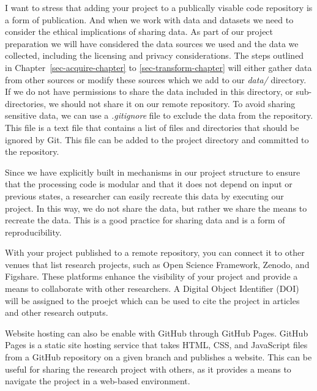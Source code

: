 \documentclass[
  letterpaper,
]{book}
\theoremstyle{definition}
\theoremstyle{remark}
\begin{document}
I want to stress that adding your project to a publically visable code
repository is a form of publication. And when we work with data and
datasets we need to consider the ethical implications of sharing data.
As part of our project preparation we will have considered the data
sources we used and the data we collected, including the licensing and
privacy considerations. The steps outlined in
Chapter~\ref{sec-acquire-chapter} to \ref{sec-transform-chapter} will
either gather data from other sources or modify these sources which we
add to our \emph{data/} directory. If we do not have permissions to
share the data included in this directory, or sub-directories, we should
not share it on our remote repository. To avoid sharing sensitive data,
we can use a \emph{.gitignore} file to exclude the data from the
repository. This file is a text file that contains a list of files and
directories that should be ignored by Git. This file can be added to the
project directory and committed to the repository.

Since we have explicitly built in mechanisms in our project structure to
ensure that the processing code is modular and that it does not depend
on input or previous states, a researcher can easily recreate this data
by executing our project. In this way, we do not share the data, but
rather we share the means to recreate the data. This is a good practice
for sharing data and is a form of reproducibility.

With your project published to a remote repository, you can connect it
to other venues that list research projects, such as Open Science
Framework, Zenodo, and Figshare. These platforms enhance the visibility
of your project and provide a means to collaborate with other
researchers. A Digital Object Identifier (DOI) will be assigned to the
proejct which can be used to cite the project in articles and other
research outputs.

Website hosting can also be enable with GitHub through GitHub Pages.
GitHub Pages is a static site hosting service that takes HTML, CSS, and
JavaScript files from a GitHub repository on a given branch and
publishes a website. This can be useful for sharing the research project
with others, as it provides a means to navigate the project in a
web-based environment.
\end{document}
